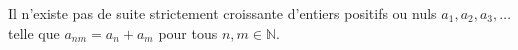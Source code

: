 Il n'existe pas de suite strictement croissante d'entiers positifs ou nuls $a_1, a_2, a_3, \ldots$ telle que $a_{nm} = a_n + a_m$ pour tous $n, m \in \mathbb{N}$.
